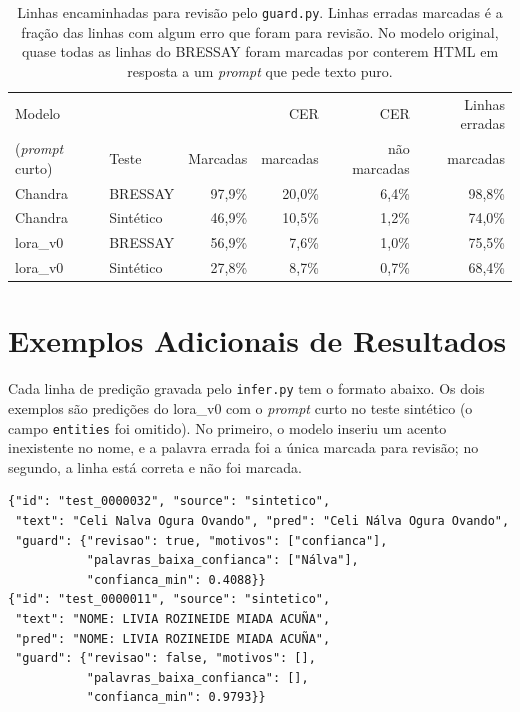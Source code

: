 \begin{table}[H]
\centering
\small
\begin{tabular}{@{}llrrrr@{}}
\toprule
Modelo & & & CER & CER & Linhas erradas \\
(\emph{prompt} curto) & Teste & Marcadas & marcadas & não marcadas & marcadas \\
\midrule
Chandra & BRESSAY & 97,9\% & 20,0\% & 6,4\% & 98,8\% \\
Chandra & Sintético & 46,9\% & 10,5\% & 1,2\% & 74,0\% \\
lora\_v0 & BRESSAY & 56,9\% & 7,6\% & 1,0\% & 75,5\% \\
lora\_v0 & Sintético & 27,8\% & 8,7\% & 0,7\% & 68,4\% \\
\bottomrule
\end{tabular}
\caption{Linhas encaminhadas para revisão pelo \texttt{guard.py}. Linhas erradas marcadas é a fração das linhas com algum erro que foram para revisão. No modelo original, quase todas as linhas do BRESSAY foram marcadas por conterem HTML em resposta a um \emph{prompt} que pede texto puro.}
\label{tab:guard}
\end{table}

\section{Exemplos Adicionais de Resultados}
\label{app:exemplos}

Cada linha de predição gravada pelo \texttt{infer.py} tem o formato abaixo. Os dois exemplos são predições do lora\_v0 com o \emph{prompt} curto no teste sintético (o campo \texttt{entities} foi omitido). No primeiro, o modelo inseriu um acento inexistente no nome, e a palavra errada foi a única marcada para revisão; no segundo, a linha está correta e não foi marcada.

{\footnotesize
\begin{verbatim}
{"id": "test_0000032", "source": "sintetico",
 "text": "Celi Nalva Ogura Ovando", "pred": "Celi Nálva Ogura Ovando",
 "guard": {"revisao": true, "motivos": ["confianca"],
           "palavras_baixa_confianca": ["Nálva"],
           "confianca_min": 0.4088}}
{"id": "test_0000011", "source": "sintetico",
 "text": "NOME: LIVIA ROZINEIDE MIADA ACUÑA",
 "pred": "NOME: LIVIA ROZINEIDE MIADA ACUÑA",
 "guard": {"revisao": false, "motivos": [],
           "palavras_baixa_confianca": [],
           "confianca_min": 0.9793}}
\end{verbatim}
}

